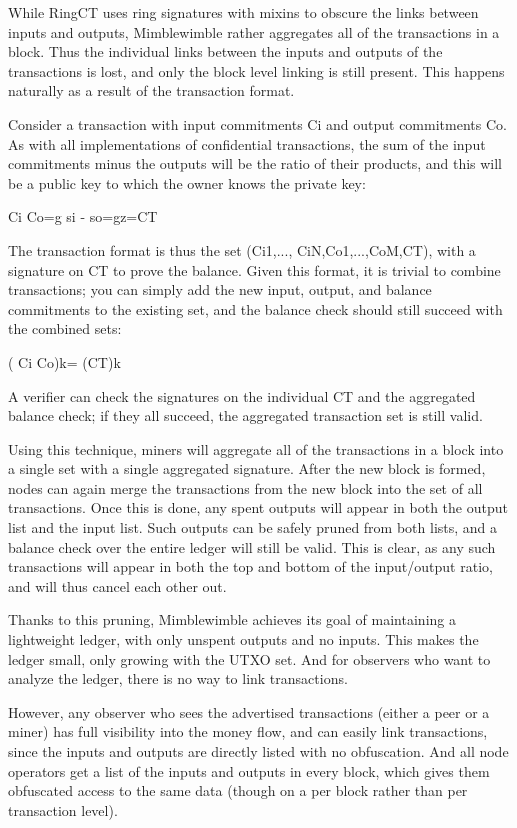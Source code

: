 \documentclass{article}
\begin{document}
While RingCT uses ring signatures with mixins to obscure the links between inputs and outputs, Mimblewimble rather aggregates all of the transactions in a block.  Thus the individual links between the inputs and outputs of the transactions is lost, and only the block level linking is still present.  This happens naturally as a result of the transaction format.

Consider a transaction with input commitments Ci and output commitments Co.  As with all implementations of confidential transactions, the sum of the input commitments minus the outputs will be the ratio of their products, and this will be a public key to which the owner knows the private key:

	 Ci Co=g si -  so=gz=CT

The transaction format is thus the set (Ci1,..., CiN,Co1,...,CoM,CT), with a signature on CT to prove the balance.  Given this format, it is trivial to combine transactions; you can simply add the new input, output, and balance commitments to the existing set, and the balance check should still succeed with the combined sets:

	(  Ci Co)k= (CT)k

A verifier can check the signatures on the individual CT and the aggregated balance check; if they all succeed, the aggregated transaction set is still valid.

Using this technique, miners will aggregate all of the transactions in a block into a single set with a single aggregated signature.  After the new block is formed, nodes can again merge the transactions from the new block into the set of all transactions.  Once this is done, any spent outputs will appear in both the output list and the input list.  Such outputs can be safely pruned from both lists, and a balance check over the entire ledger will still be valid.  This is clear, as any such transactions will appear in both the top and bottom of the input/output ratio, and will thus cancel each other out.  

Thanks to this pruning, Mimblewimble achieves its goal of maintaining a lightweight ledger, with only unspent outputs and no inputs.  This makes the ledger small, only growing with the UTXO set.  And for observers who want to analyze the ledger, there is no way to link transactions.

However, any observer who sees the advertised transactions (either a peer or a miner) has full visibility into the money flow, and can easily link transactions, since the inputs and outputs are directly listed with no obfuscation.  And all node operators get a list of the inputs and outputs in every block, which gives them obfuscated access to the same data (though on a per block rather than per transaction level).
\end{document}
